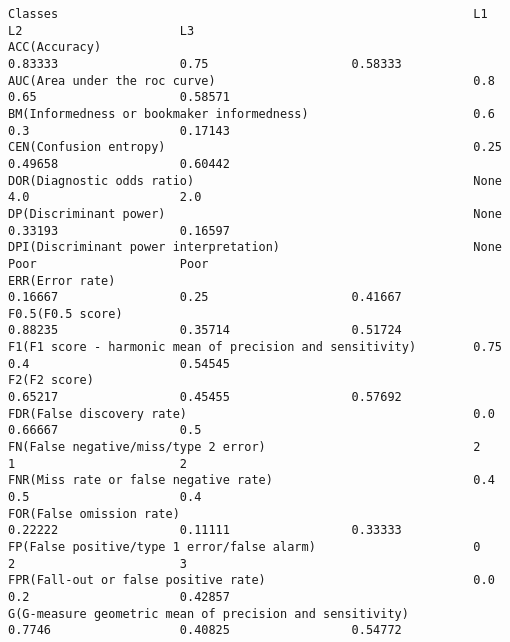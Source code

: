 \documentclass[11pt]{article}
\begin{document}
\begin{Verbatim}[commandchars=\\\{\}]
Classes                                                          L1                      L2                      L3                      
ACC(Accuracy)                                                    0.83333                 0.75                    0.58333                 
AUC(Area under the roc curve)                                    0.8                     0.65                    0.58571                 
BM(Informedness or bookmaker informedness)                       0.6                     0.3                     0.17143                 
CEN(Confusion entropy)                                           0.25                    0.49658                 0.60442                 
DOR(Diagnostic odds ratio)                                       None                    4.0                     2.0                     
DP(Discriminant power)                                           None                    0.33193                 0.16597                 
DPI(Discriminant power interpretation)                           None                    Poor                    Poor                    
ERR(Error rate)                                                  0.16667                 0.25                    0.41667                 
F0.5(F0.5 score)                                                 0.88235                 0.35714                 0.51724                 
F1(F1 score - harmonic mean of precision and sensitivity)        0.75                    0.4                     0.54545                 
F2(F2 score)                                                     0.65217                 0.45455                 0.57692                 
FDR(False discovery rate)                                        0.0                     0.66667                 0.5                     
FN(False negative/miss/type 2 error)                             2                       1                       2                       
FNR(Miss rate or false negative rate)                            0.4                     0.5                     0.4                     
FOR(False omission rate)                                         0.22222                 0.11111                 0.33333                 
FP(False positive/type 1 error/false alarm)                      0                       2                       3                       
FPR(Fall-out or false positive rate)                             0.0                     0.2                     0.42857                 
G(G-measure geometric mean of precision and sensitivity)         0.7746                  0.40825                 0.54772                 

\end{Verbatim}
\end{document}

